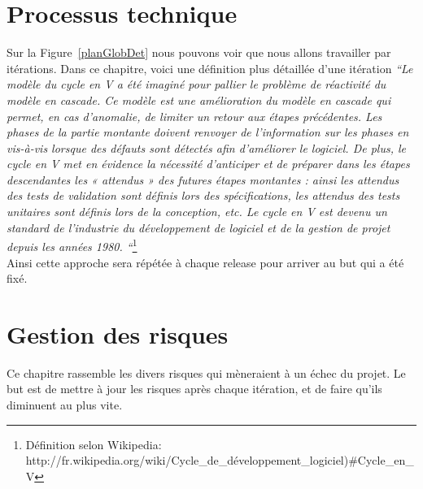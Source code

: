 \section{Processus technique}
Sur la Figure~\ref{planGlobDet} nous pouvons voir que nous allons travailler par itérations. Dans ce chapitre, voici une définition plus détaillée d'une itération 
\textit{``Le modèle du cycle en V a été imaginé pour pallier le problème de réactivité du modèle en cascade. Ce modèle est une amélioration du modèle en cascade qui permet, en cas d'anomalie, de limiter un retour aux étapes précédentes. Les phases de la partie montante doivent renvoyer de l'information sur les phases en vis-à-vis lorsque des défauts sont détectés afin d'améliorer le logiciel.
De plus, le cycle en V met en évidence la nécessité d'anticiper et de préparer dans les étapes descendantes les « attendus » des futures étapes montantes : ainsi les attendus des tests de validation sont définis lors des spécifications, les attendus des tests unitaires sont définis lors de la conception, etc.
Le cycle en V est devenu un standard de l'industrie du développement de logiciel et de la gestion de projet depuis les années 1980. ``}\footnote{Définition selon Wikipedia: http://fr.wikipedia.org/wiki/Cycle\_de\_développement\_logiciel)\#Cycle\_en\_V}\\[1cm]

Ainsi cette approche sera répétée à chaque release pour arriver au but qui a été fixé.
\section{Gestion des risques}
Ce chapitre rassemble les divers risques qui mèneraient à un échec du projet. Le but est de mettre à jour les risques après chaque itération, et de faire qu'ils diminuent au plus vite. 
